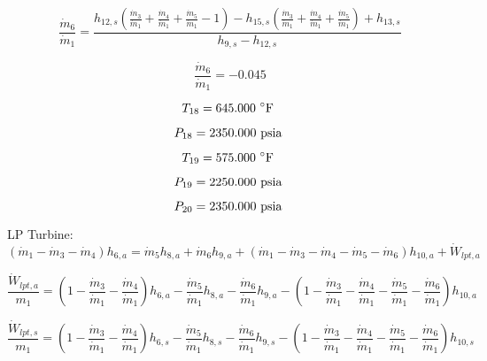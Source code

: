 \documentclass{article}
\begin{document}
\begin{equation}
\frac{\dot{m}_{ 6}}{\dot{m}_{ 1}} = \frac{h_{12,s}(\frac{\dot{m}_{3}}{\dot{m}_{1}} + \frac{\dot{m}_{4}}{\dot{m}_{1}} + \frac{\dot{m}_{5}}{\dot{m}_{1}} - 1) - h_{15,s}(\frac{\dot{m}_{3}}{\dot{m}_{1}} + \frac{\dot{m}_{4}}{\dot{m}_{1}} + \frac{\dot{m}_{5}}{\dot{m}_{1}}) + h_{13,s}}{h_{9,s} - h_{12,s}}
\end{equation}

\begin{equation}
\frac{\dot{m}_{ 6}}{\dot{m}_{ 1}} =   -0.045
\end{equation}

\begin{equation}
T_{18} =  645.000\textnormal{ \(^{\circ}\)F             }
\end{equation}

\begin{equation}
P_{18} = 2350.000\textnormal{ psia                      }
\end{equation}

\begin{equation}
T_{19} =  575.000\textnormal{ \(^{\circ}\)F             }
\end{equation}

\begin{equation}
P_{19} = 2250.000\textnormal{ psia                      }
\end{equation}

\begin{equation}
P_{20} = 2350.000\textnormal{ psia                      }
\end{equation}


LP Turbine:
\begin{equation}
(\dot{m}_{ 1} - \dot{m}_{ 3} - \dot{m}_{ 4})h_{ 6,a} = \dot{m}_{ 5}h_{ 8,a} + \dot{m}_{ 6}h_{ 9,a} + (\dot{m}_{ 1} - \dot{m}_{ 3} - \dot{m}_{ 4} - \dot{m}_{ 5} - \dot{m}_{ 6})h_{10,a} + \dot{W}_{lpt,a}
\end{equation}

\begin{equation}
\frac{\dot{W}_{lpt,a}}{m_1} = (1 - \frac{\dot{m}_{ 3}}{\dot{m}_{ 1}} - \frac{\dot{m}_{ 4}}{\dot{m}_{ 1}})h_{ 6,a} - \frac{\dot{m}_{ 5}}{\dot{m}_{ 1}}h_{ 8,a} - \frac{\dot{m}_{ 6}}{\dot{m}_{ 1}}h_{ 9,a} - (1 - \frac{\dot{m}_{ 3}}{\dot{m}_{ 1}} - \frac{\dot{m}_{ 4}}{\dot{m}_{ 1}} - \frac{\dot{m}_{ 5}}{\dot{m}_{ 1}} - \frac{\dot{m}_{ 6}}{\dot{m}_{ 1}})h_{10,a}\end{equation}

\begin{equation}\label{lpt_s}
\frac{\dot{W}_{lpt,s}}{m_1} = (1 - \frac{\dot{m}_{ 3}}{\dot{m}_{ 1}} - \frac{\dot{m}_{ 4}}{\dot{m}_{ 1}})h_{ 6,s} - \frac{\dot{m}_{ 5}}{\dot{m}_{ 1}}h_{ 8,s} - \frac{\dot{m}_{ 6}}{\dot{m}_{ 1}}h_{ 9,s} - (1 - \frac{\dot{m}_{ 3}}{\dot{m}_{ 1}} - \frac{\dot{m}_{ 4}}{\dot{m}_{ 1}} - \frac{\dot{m}_{ 5}}{\dot{m}_{ 1}} - \frac{\dot{m}_{ 6}}{\dot{m}_{ 1}})h_{10,s}\end{equation}
\end{document}
